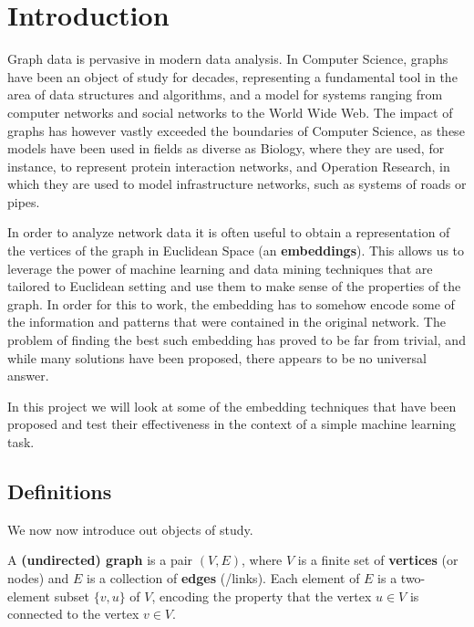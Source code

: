 \section{Introduction}
Graph data is pervasive in modern data analysis. In Computer Science, graphs have been an object of study for decades, representing a fundamental tool in the area of data structures and algorithms, and a model for systems ranging from computer networks and social networks to the World Wide Web. The impact of graphs has however vastly exceeded the boundaries of Computer Science, as these models have been used in fields as diverse as Biology, where they are used, for instance, to represent protein interaction networks, and Operation Research, in which they are used to model infrastructure networks, such as systems of roads or pipes.

In order to analyze network data it is often useful to obtain a representation of the vertices of the graph in Euclidean Space (an \textbf{embeddings}). This allows us to leverage the power of machine learning and data mining techniques that are tailored to Euclidean setting and use them to make sense of the properties of the graph. In order for this to work, the embedding has to somehow encode some of the information and patterns that were contained in the original network. The problem of finding the best such embedding has proved to be far from trivial, and while many solutions have been proposed, there appears to be no universal answer.

In this project we will look at some of the embedding techniques that have been proposed and test their effectiveness in the context of a simple machine learning task.


\subsection*{Definitions}
We now now introduce out objects of study.

A \textbf{(undirected) graph} is a pair $(V,E)$, where $V$ is a finite set of \textbf{vertices} (or nodes) and $E$ is a collection of \textbf{edges} (/links). Each element of $E$ is a two-element subset $\{v,u\}$ of $V$, encoding the property that the vertex $u \in V$ is connected to the vertex $v \in V$.
